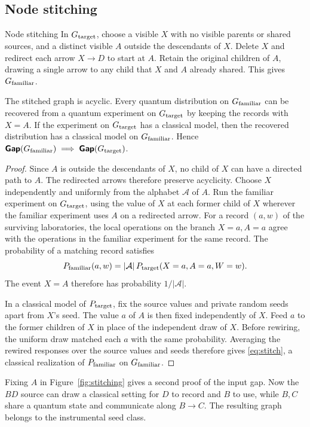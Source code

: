 \subsection{Node stitching}\label{sec:stitching}
\begin{piggyback}{Node stitching}
In \(G_{\text{target}}\), choose a visible \(X\) with no visible parents or shared
sources, and a distinct visible \(A\) outside the descendants of \(X\).
Delete \(X\) and redirect each arrow \(X\to D\) to start at \(A\).
Retain the original children of \(A\), drawing a single arrow to any
child that \(X\) and \(A\) already shared. This gives \(G_{\text{familiar}}\).
\end{piggyback}
\begin{proposition}\label{prop:stitching}
The stitched graph is acyclic. Every quantum distribution on \(G_{\text{familiar}}\)
can be recovered from a quantum experiment on \(G_{\text{target}}\) by keeping
the records with \(X=A\). If the experiment on \(G_{\text{target}}\) has a classical model, then
the recovered distribution has a classical model on \(G_{\text{familiar}}\). Hence
\(\operatorname{\text{\normalfont\sffamily\bfseries Gap}}(G_{\text{familiar}})\implies\operatorname{\text{\normalfont\sffamily\bfseries Gap}}(G_{\text{target}})\).
\end{proposition}
\begin{proof}
Since \(A\) is outside the descendants of \(X\), no child of \(X\) can have
a directed path to \(A\). The redirected arrows therefore preserve
acyclicity. Choose \(X\) independently and uniformly from the alphabet
\(\mathcal A\) of \(A\). Run the familiar experiment on \(G_{\text{target}}\), using
the value of \(X\) at each former child of \(X\) wherever the familiar
experiment uses \(A\) on a redirected arrow. For a record \((a,w)\) of the
surviving laboratories, the local operations on the branch \(X=a,A=a\)
agree with the operations in the familiar experiment for the same record.
The probability of a matching record satisfies
\begin{equation}
 P_{\text{familiar}}(a,w)=|\mathcal A|\,P_{\text{target}}(X=a,A=a,W=w).
 \label{eq:stitch}
\end{equation}
The event \(X=A\) therefore has probability \(1/|\mathcal A|\).

In a classical model of \(P_{\text{target}}\), fix the source values and private
random seeds apart from \(X\)'s seed. The value \(a\) of \(A\) is then fixed
independently of \(X\). Feed \(a\) to the former children of \(X\) in place
of the independent draw of \(X\). Before rewiring, the uniform draw matched
each \(a\) with the same probability. Averaging the rewired responses over
the source values and seeds therefore gives \eqref{eq:stitch}, a classical
realization of \(P_{\text{familiar}}\) on \(G_{\text{familiar}}\).
\end{proof}
Fixing \(A\) in Figure~\ref{fig:stitching} gives a second proof of
the input gap. Now the \(BD\) source can draw a classical setting for
\(D\) to record and \(B\) to use, while \(B,C\) share a quantum state
and communicate along \(B\to C\). The resulting graph belongs to the
instrumental seed class.

